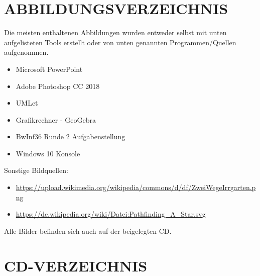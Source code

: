 \documentclass[a4paper,12pt]{article}
\begin{document}
\newpage
\section{ABBILDUNGSVERZEICHNIS}
Die meisten enthaltenen Abbildungen wurden entweder selbst mit unten aufgelisteten Tools erstellt oder von unten genannten Programmen/Quellen aufgenommen.
\begin{itemize}
\item Microsoft PowerPoint
\item Adobe Photoshop CC 2018
\item UMLet
\item Grafikrechner - GeoGebra
\item BwInf36 Runde 2 Aufgabenstellung \cite{bwinf_aufgaben}
\item Windows 10 Konsole
\end{itemize}

Sonstige Bildquellen:
\begin{itemize}
\item \url{https://upload.wikimedia.org/wikipedia/commons/d/df/ZweiWegeIrrgarten.png}
\item \url{https://de.wikipedia.org/wiki/Datei:Pathfinding\_A\_Star.svg}
\end{itemize}

\vspace{1cm}
Alle Bilder befinden sich auch auf der beigelegten CD.


\newpage
\section{CD-VERZEICHNIS}
\end{document}
